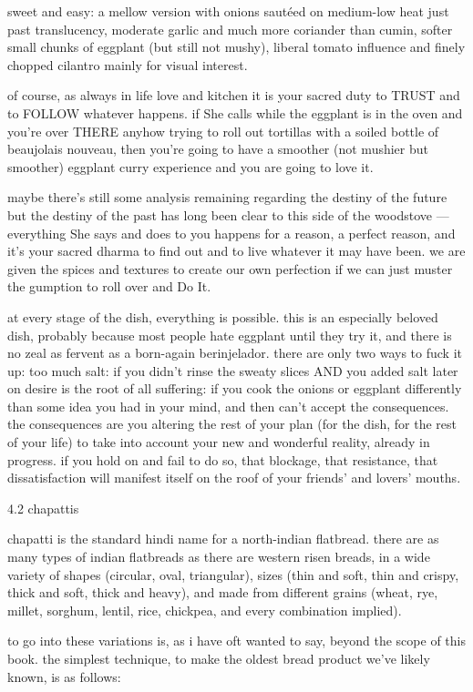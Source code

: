 sweet and easy: a mellow version with onions saut\'{e}ed on medium-low heat just past translucency, moderate garlic and much more coriander than cumin, softer small chunks of eggplant (but still not mushy), liberal tomato influence and finely chopped cilantro mainly for visual interest. 

of course, as always in life love and kitchen it is your sacred duty to TRUST and to FOLLOW whatever happens. if She calls while the eggplant is in the oven and you're over THERE anyhow trying to roll out tortillas with a soiled bottle of beaujolais nouveau, then you're going to have a smoother (not mushier but smoother) eggplant curry experience and you are going to love it.

maybe there's still some analysis remaining regarding the destiny of the future but the destiny of the past has long been clear to this side of the woodstove --- everything She says and does to you happens for a reason, a perfect reason, and it's your sacred dharma to find out and to live whatever it may have been. we are given the spices and textures to create our own perfection if we can just muster the gumption to roll over and Do It.

at every stage of the dish, everything is possible. this is an especially beloved dish, probably because most people hate eggplant until they try it, and there is no zeal as fervent as a born-again berinjelador. there are only two ways to fuck it up:
	too much salt: if you didn't rinse the sweaty slices AND you added salt later on
	desire is the root of all suffering: if you cook the onions or eggplant differently than some idea you had in your mind, and then can't accept the consequences. the consequences are you altering the rest of your plan (for the dish, for the rest of your life) to take into account your new and wonderful reality, already in progress. if you hold on and fail to do so, that blockage, that resistance, that dissatisfaction will manifest itself on the roof of your friends' and lovers' mouths.

4.2  chapattis

chapatti is the standard hindi name for a north-indian flatbread. there are as many types of indian flatbreads as there are western risen breads, in a wide variety of shapes (circular, oval, triangular), sizes (thin and soft, thin and crispy, thick and soft, thick and heavy), and made from different grains (wheat, rye, millet, sorghum, lentil, rice, chickpea, and every combination implied).

to go into these variations is, as i have oft wanted to say, beyond the scope of this book. the simplest technique, to make the oldest bread product we've likely known, is as follows:

